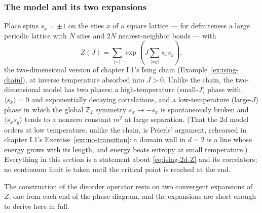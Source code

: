 \subsubsection{The model and its two expansions}
\label{sec:two-expansions}

Place spins $s_x = \pm 1$ on the sites $x$ of a square lattice --- for
definiteness a large periodic lattice with $N$ sites and $2N$
nearest-neighbor bonds --- with
\begin{equation}
Z(J) = \sum_{\{s\}} \exp\left( J \sum_{\langle xy \rangle} s_x s_y \right),
\label{eq:ising-2d-Z}
\end{equation}
the two-dimensional version of chapter I.1's Ising chain
(Example~\ref{ex:ising-chain}), at inverse temperature absorbed into
$J > 0$. Unlike the chain, the two-dimensional model has two phases: a
high-temperature (small-$J$)  phase with
$\langle s_x \rangle = 0$ and exponentially decaying correlations, and a
low-temperature (large-$J$)  phase in which the global
$\mathbb{Z}_2$ symmetry $s_x \to -s_x$ is spontaneously broken and
$\langle s_x s_y\rangle$ tends to a nonzero constant $m^2$ at large
separation. (That the 2d model orders at low temperature, unlike the
chain, is Peierls' argument, rehearsed in chapter I.1's
Exercise~\ref{exr:no-transition}: a domain wall in $d=2$ is a line whose
energy grows with its length, and energy beats entropy at small
temperature.) Everything in this section is a statement about
\eqref{eq:ising-2d-Z} and its correlators; no continuum limit is taken
until the critical point is reached at the end.

The construction of the disorder operator rests on two convergent
expansions of $Z$, one from each end of the phase diagram, and the
expansions are short enough to derive here in full.

